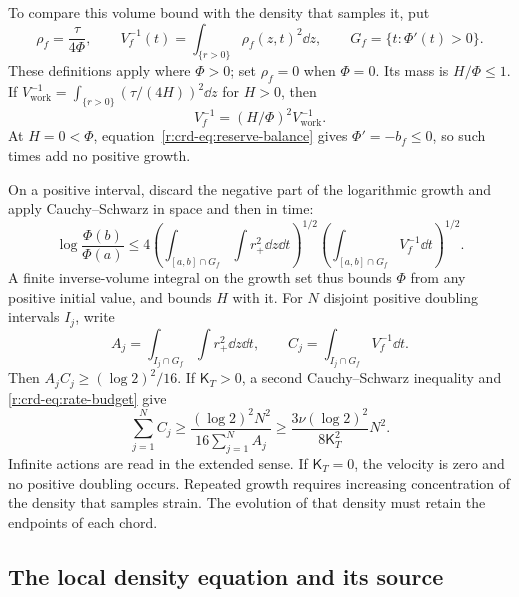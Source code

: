 To compare this volume bound with the density that samples it, put
\begin{equation}
 \rho_f=\frac{\tau}{4\Phi},\qquad
 V_f^{-1}(t)=\int_{\{r>0\}}\rho_f(z,t)^2\dd z,\qquad
 G_f=\{t:\Phi'(t)>0\}.
 \label{r:crd-eq:volume}
\end{equation}
These definitions apply where \(\Phi>0\); set \(\rho_f=0\) when
\(\Phi=0\). Its mass is \(H/\Phi\le1\). If
\(V_{\mathrm{work}}^{-1}=\int_{\{r>0\}}(\tau/(4H))^2\dd z\) for
\(H>0\), then
\[
 V_f^{-1}=(H/\Phi)^2V_{\mathrm{work}}^{-1}.
\]
At \(H=0<\Phi\), equation~\eqref{r:crd-eq:reserve-balance} gives
\(\Phi'=-b_f\le0\), so such times add no positive growth.

On a positive interval, discard the negative part of the logarithmic
growth and apply Cauchy--Schwarz in space and then in time:
\begin{equation}
 \log\frac{\Phi(b)}{\Phi(a)}
 \le4
 \left(\int_{[a,b]\cap G_f}\int r_+^2\dd z\dd t\right)^{1/2}
 \left(\int_{[a,b]\cap G_f}V_f^{-1}\dd t\right)^{1/2}.
 \label{r:crd-eq:growth-volume}
\end{equation}
A finite inverse-volume integral on the growth set thus bounds \(\Phi\)
from any positive initial value, and bounds \(H\) with it.
For \(N\) disjoint positive doubling intervals \(I_j\), write
\[
 A_j=\int_{I_j\cap G_f}\int r_+^2\dd z\dd t,\qquad
 C_j=\int_{I_j\cap G_f}V_f^{-1}\dd t.
\]
Then \(A_jC_j\ge(\log2)^2/16\). If \(\mathsf K_T>0\), a second
Cauchy--Schwarz inequality and \eqref{r:crd-eq:rate-budget} give
\begin{equation}
 \sum_{j=1}^N C_j
 \ge\frac{(\log2)^2N^2}{16\sum_{j=1}^N A_j}
 \ge\frac{3\nu(\log2)^2}{8\mathsf K_T^2}N^2.
 \label{r:crd-eq:repeated-growth}
\end{equation}
Infinite actions are read in the extended sense. If \(\mathsf K_T=0\),
the velocity is zero and no positive doubling occurs. Repeated growth
requires increasing concentration of the density that samples strain.
The evolution of that density must retain the endpoints of each chord.

\subsection{The local density equation and its source}

